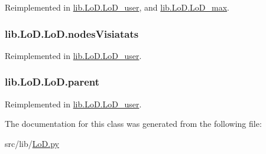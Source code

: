 Reimplemented in \hyperlink{classlib_1_1_lo_d_1_1_lo_d__user_a6c143a99cb426fccf4e1aa450d1f9b37}{lib.\-Lo\-D.\-Lo\-D\-\_\-user}, and \hyperlink{classlib_1_1_lo_d_1_1_lo_d__max_a31aa5cce5529c71dd22efbe015f7e2bd}{lib.\-Lo\-D.\-Lo\-D\-\_\-max}.

\hypertarget{classlib_1_1_lo_d_1_1_lo_d_ae9ac9b8c5a1b8c66518f1681bff48078}{
\subsubsection[{nodes\-Visiatats}]{\setlength{\rightskip}{0pt plus 5cm}lib.\-Lo\-D.\-Lo\-D.\-nodes\-Visiatats}}\label{classlib_1_1_lo_d_1_1_lo_d_ae9ac9b8c5a1b8c66518f1681bff48078}


Reimplemented in \hyperlink{classlib_1_1_lo_d_1_1_lo_d__user_a7de3b2dcf364d63f808f39b9154c4a30}{lib.\-Lo\-D.\-Lo\-D\-\_\-user}.

\hypertarget{classlib_1_1_lo_d_1_1_lo_d_a19c56f06f44d2285fbfc8fa6e69bff6b}{
\subsubsection[{parent}]{\setlength{\rightskip}{0pt plus 5cm}lib.\-Lo\-D.\-Lo\-D.\-parent}}\label{classlib_1_1_lo_d_1_1_lo_d_a19c56f06f44d2285fbfc8fa6e69bff6b}


Reimplemented in \hyperlink{classlib_1_1_lo_d_1_1_lo_d__user_a71fae9e48d7b735bce5ed983c79bdfe5}{lib.\-Lo\-D.\-Lo\-D\-\_\-user}.



The documentation for this class was generated from the following file\-:\begin{DoxyCompactItemize}
\item 
src/lib/\hyperlink{_lo_d_8py}{Lo\-D.\-py}\end{DoxyCompactItemize}
